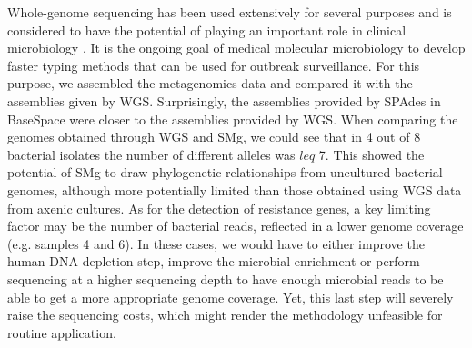 Whole-genome sequencing has been used extensively for several purposes \citep{deurenberg_application_2017} and is considered to have the potential of playing an important role in clinical microbiology \citep{rossen_practical_2018}. It is the ongoing goal of medical molecular microbiology to develop faster typing methods that can be used for outbreak surveillance. For this purpose, we assembled the metagenomics data and compared it with the assemblies given by \ac{WGS}. Surprisingly, the assemblies provided by SPAdes in BaseSpace were closer to the assemblies provided by \ac{WGS}. When comparing the genomes obtained through \ac{WGS} and \ac{SMg}, we could see that in 4 out of 8 bacterial isolates the number of different alleles was $leq$ 7. This showed the potential of \ac{SMg} to draw phylogenetic relationships from uncultured bacterial genomes, although more potentially limited than those obtained using \ac{WGS} data from axenic cultures. As for the detection of resistance genes, a key limiting factor may be the number of bacterial reads, reflected in a lower genome coverage (e.g. samples 4 and 6). In these cases, we would have to either improve the human-DNA depletion step, improve the microbial enrichment or perform sequencing at a higher sequencing depth to have enough microbial reads to be able to get a more appropriate genome coverage. Yet, this last step will severely raise the sequencing costs, which might render the methodology unfeasible for routine application.

